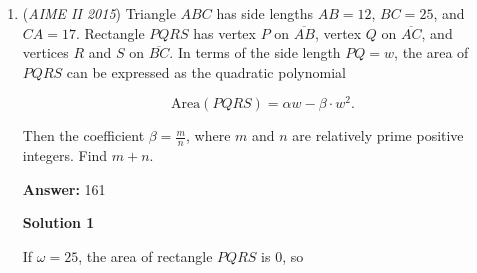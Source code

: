\begin{enumerate}
 



\textbf{Solution 3 (Basic calculus)}

Since each of the roots is positive, the local maximum of the function must occur at a positive value of $x$. Taking $\frac{d}{dx}$ of the polynomial yields $6x^2-4ax+a^2-81$, which is equal to $0$ at the local maximum. Since this is a quadratic in $a$, we can find an expression for $a$ in terms of $x$. The quadratic formula gives $a=\frac{4x\pm\sqrt{324-8x^2}}{2}$, which simplifies to $a=2x\pm\sqrt{81-2x^2}$. We know that $a$ is a positive integer, and testing small positive integer values of $x$ yields $a=15$ or $a=1$ when $x=4$, and $a=15$ or $a=9$ when $x=6$. Because the value of $a$ alone does not determine the polynomial, $a$, $a$ must equal $15$.

 Now our polynomial equals $2x^3-30x^2+144x-c$. Because one root is less than (or equal to) the $x$ value at the local maximum (picture the graph of a cubic equation), it suffices to synthetically divide by small integer values of $x$ to see if the resulting quadratic also has positive integer roots. Dividing by $x=3$ leaves a quotient of $2x^2-24x+72=2(x-6)^2$, and dividing by $x=4$ leaves a quotient of $2x^2-22x+56=2(x-4)(x-7)$. Thus, $c=2\cdot 3\cdot 6\cdot 6=216$, or $c=2\cdot 4\cdot 4\cdot 7=224$. Our answer is $216+224=\boxed{440}$ ~bad\_at\_mathcounts

 


 


 


	\item (\textit{AIME II 2015}) Triangle $ABC$ has side lengths $AB = 12$, $BC = 25$, and $CA = 17$. Rectangle $PQRS$ has vertex $P$ on $\overline{AB}$, vertex $Q$ on $\overline{AC}$, and vertices $R$ and $S$ on $\overline{BC}$. In terms of the side length $PQ = w$, the area of $PQRS$ can be expressed as the quadratic polynomial


 
 \[\text{Area}(PQRS) = \alpha w - \beta \cdot w^2.\]


 Then the coefficient $\beta = \frac{m}{n}$, where $m$ and $n$ are relatively prime positive integers. Find $m+n$.


 
 \textbf{Answer: }161



\textbf{Solution 1}

If $\omega = 25$,  the area of rectangle $PQRS$ is $0$, so


\end{enumerate}
